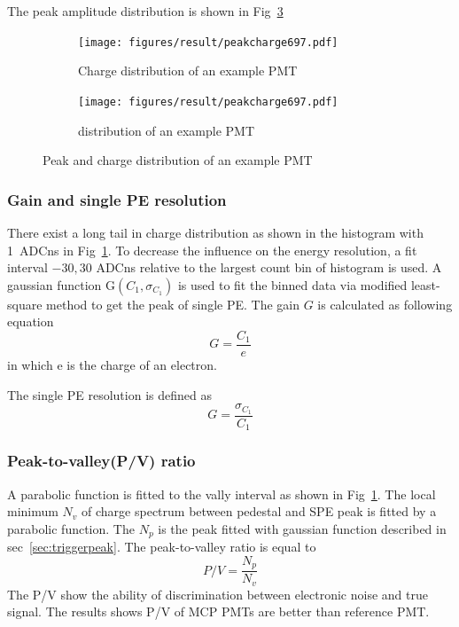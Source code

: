 The peak amplitude distribution is shown in Fig~\ref{fig:peak}
\begin{figure}[!htbp]
    \centering
    \begin{subfigure}[t]{0.45\textwidth}
        \texttt{[image: figures/result/peakcharge697.pdf]}
        \caption{Charge distribution of an example PMT}%
        \label{fig:charge}
    \end{subfigure}
    \begin{subfigure}[t]{0.45\textwidth}
        \texttt{[image: figures/result/peakcharge697.pdf]}
        \caption{ distribution of an example PMT}%
        \label{fig:peak}
    \end{subfigure}
    \caption{Peak and charge distribution of an example PMT}
\end{figure}
\subsubsection{Gain and single PE resolution}
There exist a long tail in charge distribution as shown in the histogram with \SI{1}{ADCns} in Fig~\ref{fig:charge}. To decrease the influence on the energy resolution, a fit interval $-30, 30$ ADCns relative to the largest count bin of histogram is used. A gaussian function G$(C_1,\sigma_{C_1})$ is used to fit the binned data via modified least-square method to get the peak of single PE. The gain $G$ is calculated as following equation
\begin{equation}
    G=\frac{C_1}{e}
\end{equation}
in which e is the charge of an electron.

The single PE resolution is defined as
\begin{equation}
    G=\frac{\sigma_{C_1}}{C_1}
\end{equation}
\subsubsection{Peak-to-valley(P/V) ratio}
A parabolic function is fitted to the vally interval as shown in Fig~\ref{fig:charge}.
The local minimum $N_v$ of charge spectrum between pedestal and SPE peak is fitted by a parabolic function. The $N_p$ is the peak fitted with gaussian function described in sec~\ref{sec:triggerpeak}.
The peak-to-valley ratio is equal to  
\begin{equation}
    P/V=\frac{N_p}{N_v}
\end{equation}
The P/V show the ability of discrimination between electronic noise and true signal. The results shows P/V of MCP PMTs are better than reference PMT.
